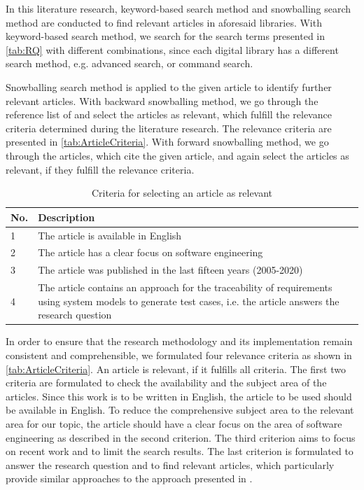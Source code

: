 In this literature research, keyword-based search method and snowballing search method are conducted to find relevant articles in aforesaid libraries. With keyword-based search method, we search for the search terms presented in \autoref{tab:RQ} with different combinations, since each digital library has a different search method, e.g.  advanced search, or command search.

Snowballing search method is applied to the given article \cite{Paper1} to identify further relevant articles. With backward snowballing method, we go through the reference list of \cite{Paper1} and select the articles as relevant, which fulfill the relevance criteria determined during the literature research. The relevance criteria are presented in \autoref{tab:ArticleCriteria}. With forward snowballing method, we go through the articles, which cite the given article, and again select the articles as relevant, if they fulfill the relevance criteria.


\begin{table} [htb] 
\centering
\begin{small}
\caption{Criteria for selecting an article as relevant}
\label{tab:ArticleCriteria}
\setlength{\tabcolsep}{1em}
\begin{tabular}{ l| p{12cm}}
\hline
\textbf{No.} & \textbf{Description} \\
\hline
1 & The article is available in English\\
\hline
2  & The article has a clear focus on software engineering\\
\hline
3  & The article was published in the last fifteen years (2005-2020) \\
\hline
4  &  The article contains an approach for the traceability of requirements using system models to generate test cases, i.e. the article answers the research question\\
\hline
\end{tabular}
\end{small}
\end{table}

In order to ensure that the research methodology and its implementation remain consistent and comprehensible, we formulated four relevance criteria as shown in \autoref{tab:ArticleCriteria}. An article is relevant, if it fulfills all criteria. The first two criteria are formulated to check the availability and the subject area of the articles. Since this work is to be written in English, the article to be used should be available in English. To reduce the comprehensive subject area to the relevant area for our topic, the article should have a clear focus on the area of software engineering as described in the second criterion. The third criterion aims to focus on recent work and to limit the search results. The last criterion is formulated to answer the research question and to find relevant articles, which particularly provide similar approaches to the approach presented in \cite{Paper1}.

